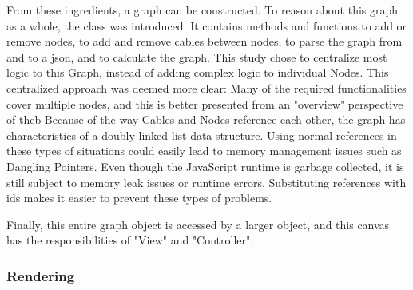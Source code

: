 From these ingredients, a graph can be constructed. 
To reason about this graph as a whole, the  class was introduced. 
It contains methods and functions to add or remove nodes, to add and remove cables between nodes, to parse the graph from and to a json, and to calculate the graph.  
This study chose to centralize most logic to this Graph, instead of adding complex logic to individual Nodes. 
This centralized approach was deemed more clear: Many of the required functionalities cover multiple nodes, and this is better presented from an "overview" perspective of theb 
Because of the way Cables and Nodes reference each other, the graph has characteristics of a doubly linked list data structure. Using normal references in these types of situations could easily lead to memory management issues such as Dangling Pointers. Even though the JavaScript runtime is garbage collected, it is still subject to memory leak issues or runtime errors. Substituting references with ids makes it easier to prevent these types of problems. 

Finally, this entire graph object is accessed by a larger  object, and this canvas has the responsibilities of "View" and "Controller". 

\subsubsection*{Rendering}

